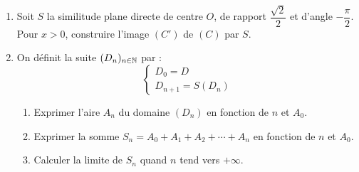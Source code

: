 \documentclass[11pt]{article}
\begin{document}
\begin{enumerate}[start=6]
  \item Soit $S$ la similitude plane directe de centre $O$, de rapport $\dfrac{\sqrt{2}}{2}$ et d'angle $-\dfrac{\pi}{2}$. Pour $x > 0$, construire l'image $(C')$ de $(C)$ par $S$.
  \item On définit la suite $(D_n)_{n\in\mathbb{N}}$ par :
  \[ \begin{cases} D_0 = D \\ D_{n+1} = S(D_n) \end{cases} \]
  \begin{enumerate}[label=\alph*.]
    \item Exprimer l'aire $A_n$ du domaine $(D_n)$ en fonction de $n$ et $A_0$.
    \item Exprimer la somme $S_n = A_0 + A_1 + A_2 + \cdots + A_n$ en fonction de $n$ et $A_0$.
    \item Calculer la limite de $S_n$ quand $n$ tend vers $+\infty$.
  \end{enumerate}
\end{enumerate}
\end{document}

